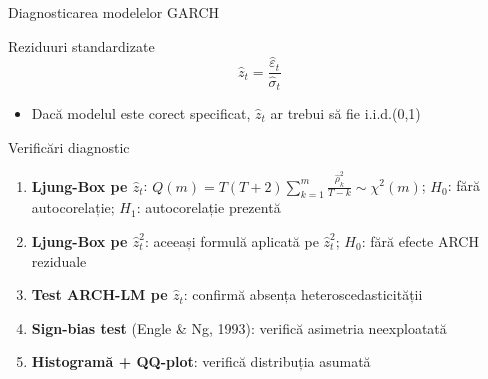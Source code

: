 \documentclass[9pt, aspectratio=169, t]{beamer}
\begin{document}
\begin{frame}{Diagnosticarea modelelor GARCH}
    \small
        \begin{block}{Reziduuri standardizate}
            \[
                \hat{z}_t = \frac{\hat{\varepsilon}_t}{\hat{\sigma}_t}
            \]
            \begin{itemize}
                \item Dacă modelul este corect specificat, $\hat{z}_t$ ar trebui să fie i.i.d.(0,1)
            \end{itemize}
        \end{block}

        \vspace{0.3cm}

        \begin{block}{Verificări diagnostic}
            \begin{enumerate}
                \item \textbf{Ljung-Box pe $\hat{z}_t$}: $Q(m) = T(T+2)\sum_{k=1}^{m}\frac{\hat{\rho}_k^2}{T-k} \sim \chi^2(m)$;\; $H_0$: fără autocorelație; $H_1$: autocorelație prezentă
                \item \textbf{Ljung-Box pe $\hat{z}_t^2$}: aceeași formulă aplicată pe $\hat{z}_t^2$;\; $H_0$: fără efecte ARCH reziduale
                \item \textbf{Test ARCH-LM pe $\hat{z}_t$}: confirmă absența heteroscedasticității
                \item \textbf{Sign-bias test} (Engle \& Ng, 1993): verifică asimetria neexploatată
                \item \textbf{Histogramă + QQ-plot}: verifică distribuția asumată
            \end{enumerate}
        \end{block}
\end{frame}
\end{document}
